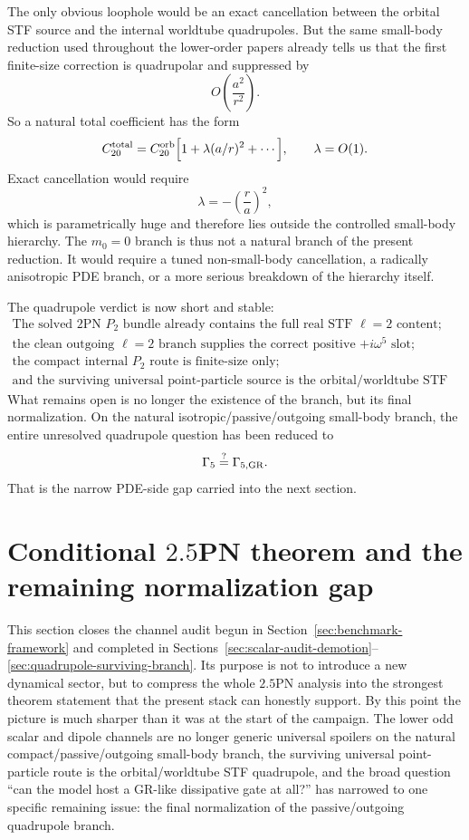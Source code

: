\documentclass[11pt]{article}
\begin{document}
The only obvious loophole would be an exact cancellation between the orbital STF
source and the internal worldtube quadrupoles.  But the same small-body
reduction used throughout the lower-order papers already tells us that the first
finite-size correction is quadrupolar and suppressed by
\[
O\!\left(\frac{a^2}{r^2}\right).
\]
So a natural total coefficient has the form
\[
C_{20}^{\rm total}=C_{20}^{\rm orb}\Bigl[1+\lambda(a/r)^2+\cdots\Bigr],
\qquad
\lambda=O(1).
\]
Exact cancellation would require
\[
\lambda=-\left(\frac{r}{a}\right)^2,
\]
which is parametrically huge and therefore lies outside the controlled small-body
hierarchy.  The $m_0=0$ branch is thus not a natural branch of the present
reduction.  It would require a tuned non-small-body cancellation, a radically
anisotropic PDE branch, or a more serious breakdown of the hierarchy itself.

The quadrupole verdict is now short and stable:
\[
\boxed{\begin{gathered}
\text{The solved $2$PN $P_2$ bundle already contains the full real STF $\ell=2$ content;}\\
\text{the clean outgoing $\ell=2$ branch supplies the correct positive $+i\omega^5$ slot;}\\
\text{the compact internal $P_2$ route is finite-size only;}\\
\text{and the surviving universal point-particle source is the orbital/worldtube STF quadrupole.}
\end{gathered}}
\]
What remains open is no longer the existence of the branch, but its final
normalization.  On the natural isotropic/passive/outgoing small-body branch, the
entire unresolved quadrupole question has been reduced to
\[
\Gamma_5\stackrel{?}{=}\Gamma_{5,{\rm GR}}.
\]
That is the narrow PDE-side gap carried into the next section.

\section{Conditional \texorpdfstring{$2.5$}{2.5}PN theorem and the remaining normalization gap}
\label{sec:conditional-theorem-gap}

This section closes the channel audit begun in
Section~\ref{sec:benchmark-framework} and completed in
Sections~\ref{sec:scalar-audit-demotion}--\ref{sec:quadrupole-surviving-branch}.
Its purpose is not to introduce a new dynamical sector, but to compress the
whole $2.5$PN analysis into the strongest theorem statement that the present
stack can honestly support.  By this point the picture is much sharper than it
was at the start of the campaign.  The lower odd scalar and dipole channels are
no longer generic universal spoilers on the natural compact/passive/outgoing
small-body branch, the surviving universal point-particle route is the
orbital/worldtube STF quadrupole, and the broad question ``can the model host a
GR-like dissipative gate at all?'' has narrowed to one specific remaining issue:
the final normalization of the passive/outgoing quadrupole branch.
\end{document}
